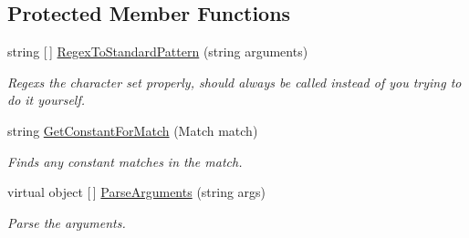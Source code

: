 \subsection*{Protected Member Functions}
\begin{DoxyCompactItemize}
\item 
string \mbox{[}$\,$\mbox{]} \hyperlink{class_developer_console_1_1_core_1_1_command_base_a9a15420bd47468900b586ae11de88a66}{Regex\+To\+Standard\+Pattern} (string arguments)
\begin{DoxyCompactList}\small\item\em Regexs the character set properly, should always be called instead of you trying to do it yourself. \end{DoxyCompactList}\item 
string \hyperlink{class_developer_console_1_1_core_1_1_command_base_ab91af9ff56ca90d0c2e23113840cbc27}{Get\+Constant\+For\+Match} (Match match)
\begin{DoxyCompactList}\small\item\em Finds any constant matches in the match. \end{DoxyCompactList}\item 
virtual object \mbox{[}$\,$\mbox{]} \hyperlink{class_developer_console_1_1_core_1_1_command_base_a63fcbc0b16344db48f1dfaab96d86759}{Parse\+Arguments} (string args)
\begin{DoxyCompactList}\small\item\em Parse the arguments. \end{DoxyCompactList}\end{DoxyCompactItemize}

